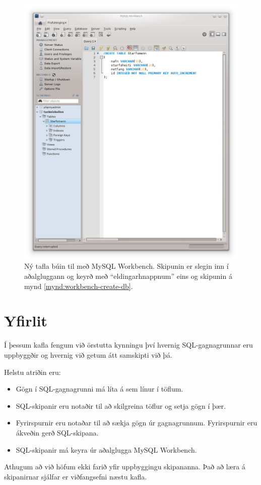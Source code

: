 \begin{figure}
\caption[Ný tafla]{Ný tafla búin til með MySQL Workbench. Skipunin er slegin inn í aðalgluggann og keyrð með ``eldingarhnappnum'' eins og skipunin á mynd \ref{mynd:workbench-create-db}.}
\label{mynd:workbench-create-table}
\centering
\includegraphics[width=0.8\linewidth]{myndir/workbench-create-table}
\end{figure}

\section{Yfirlit}
Í þessum kafla fengum við örstutta kynningu því hvernig SQL-gagnagrunnar eru uppbyggðir og hvernig við getum átt samskipti við þá. 

Helstu atriðin eru:
\begin{itemize}
 \item Gögn í SQL-gagnagrunni má líta á sem línur í töflum.
 \item SQL-skipanir eru notaðir til að skilgreina töflur og setja gögn í þær.
 \item Fyrirspurnir eru notaðar til að sækja gögn úr gagnagrunnum. Fyrirspurnir eru ákveðin gerð SQL-skipana.
 \item SQL-skipanir má keyra úr aðalglugga MySQL Workbench.
\end{itemize}
Athugum að við höfum ekki farið yfir uppbyggingu skipananna. Það að læra á skipanirnar sjálfar er viðfangsefni næstu kafla.